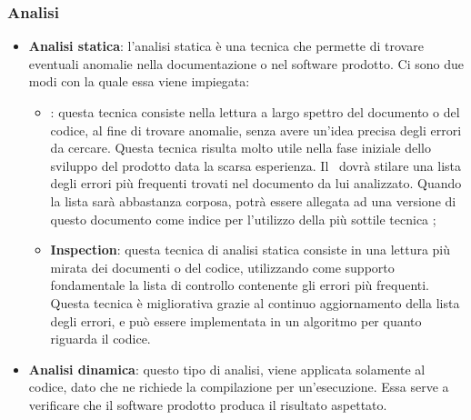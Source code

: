 \documentclass[../NormeDiProgetto.tex]{subfiles}
\begin{document}
\subsubsection{Analisi}
\begin{itemize}
\item \textbf{Analisi statica}:
l'analisi statica è una tecnica che permette di trovare eventuali anomalie nella
documentazione o nel software prodotto. Ci sono due modi con la quale essa viene
impiegata:
\begin{itemize}
  \item \textbf{}: questa tecnica consiste nella lettura a largo spettro del documento o del codice, al fine di trovare anomalie, senza avere un'idea precisa degli errori da cercare.
Questa tecnica risulta molto utile nella fase iniziale dello sviluppo del prodotto data la scarsa esperienza. Il \verificatore\ dovrà stilare una lista degli errori più frequenti trovati nel documento da lui analizzato. Quando la lista sarà abbastanza corposa, potrà essere allegata ad una versione di questo documento come indice per l'utilizzo della più sottile tecnica ;
  \item \textbf{Inspection}: questa tecnica di analisi statica consiste in una lettura più mirata dei documenti o del codice, utilizzando come supporto fondamentale la lista di controllo contenente gli errori più frequenti. Questa tecnica è migliorativa grazie al continuo aggiornamento della lista degli errori, e può essere implementata in un algoritmo per quanto riguarda il codice.
\end{itemize}
\item \textbf{Analisi dinamica}:
questo tipo di analisi, viene applicata solamente al codice, dato che ne richiede la compilazione per un'esecuzione. Essa serve a verificare che il software prodotto produca il risultato aspettato.
\end{itemize}
\end{document}
